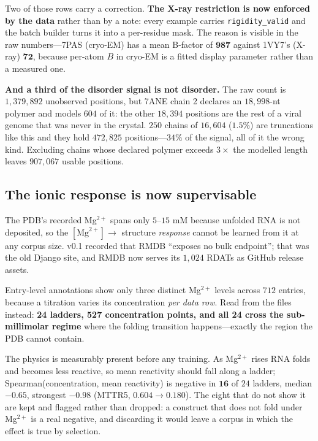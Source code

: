 \documentclass[11pt,a4paper]{article}
\begin{document}
Two of those rows carry a correction. \textbf{The X-ray restriction is now
enforced by the data} rather than by a note: every example carries
\texttt{rigidity\_valid} and the batch builder turns it into a per-residue mask.
The reason is visible in the raw numbers---7PAS (cryo-EM) has a mean B-factor of
$\mathbf{987}$ against 1VY7's (X-ray) $\mathbf{72}$, because per-atom $B$ in
cryo-EM is a fitted display parameter rather than a measured one.

\textbf{And a third of the disorder signal is not disorder.} The raw count is
$1{,}379{,}892$ unobserved positions, but 7ANE chain 2 declares an $18{,}998$-nt
polymer and models $604$ of it: the other $18{,}394$ positions are the rest of a
viral genome that was never in the crystal. $250$ chains of $16{,}604$
($1.5\%$) are truncations like this and they hold $472{,}825$ positions---$34\%$
of the signal, all of it the wrong kind. Excluding chains whose declared polymer
exceeds $3\times$ the modelled length leaves $907{,}067$ usable positions.

\subsection{The ionic response is now supervisable}

The PDB's recorded Mg$^{2+}$ spans only $5$--$15$ mM because unfolded RNA is not
deposited, so the $[\mathrm{Mg}^{2+}] \rightarrow$ structure \emph{response}
cannot be learned from it at any corpus size. v0.1 recorded that RMDB ``exposes
no bulk endpoint''; that was the old Django site, and RMDB now serves its
$1{,}024$ RDATs as GitHub release assets.

Entry-level annotations show only three distinct Mg$^{2+}$ levels across $712$
entries, because a titration varies its concentration \emph{per data row}. Read
from the files instead: \textbf{24 ladders, 527 concentration points, and all 24
cross the sub-millimolar regime} where the folding transition happens---exactly
the region the PDB cannot contain.

The physics is measurably present before any training. As Mg$^{2+}$ rises RNA
folds and becomes less reactive, so mean reactivity should fall along a ladder;
Spearman(concentration, mean reactivity) is negative in $\mathbf{16}$ of $24$
ladders, median $\mathbf{-0.65}$, strongest $\mathbf{-0.98}$ (MTTR5,
$0.604 \rightarrow 0.180$). The eight that do not show it are kept and flagged
rather than dropped: a construct that does not fold under Mg$^{2+}$ is a real
negative, and discarding it would leave a corpus in which the effect is true by
selection.
\end{document}

